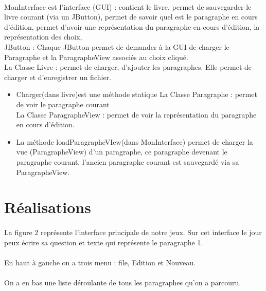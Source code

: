 \documentclass[12pt,a4paper]{article}
\begin{document}
\paragraph{}MonInterface  est l’interface (GUI) : contient le livre,  permet de sauvegarder le livre courant (via un JButton), permet de savoir quel est le paragraphe en cours d'édition, permet d’avoir une représentation du paragraphe en cours d'édition, la représentation des choix, \\
JButton : Chaque JButton permet de demander à la GUI de charger le Paragraphe et la ParagrapheView associés au choix cliqué.\\
La Classe Livre : permet de charger, d’ajouter les paragraphes. Elle permet de charger et d’enregistrer un fichier.\\
\begin{itemize}
     \item	Charger(dans livre)est une méthode statique
     La Classe Paragraphe : permet de voir le paragraphe courant\\
     La Classe ParagrapheView : permet de voir la représentation du paragraphe en cours d'édition.\\
     \item	La méthode loadParagrapheVIew(dans MonInterface) permet de charger la vue (ParagrapheView) d'un paragraphe, ce paragraphe devenant le paragraphe courant, l'ancien paragraphe courant est sauvegardé via sa ParagrapheView.
\end{itemize}

\newpage
\section{Réalisations}
\paragraph{} La figure 2 représente  l'interface principale de notre jeux. Sur cet interface le jour peux écrire sa question et texte qui représente le paragraphe 1. 
  \paragraph{} En haut à gauche on a trois menu : file, Edition et Nouveau.
  \paragraph{}On a en bas une liste déroulante de tous les paragraphes qu'on a parcouru.
\end{document}
